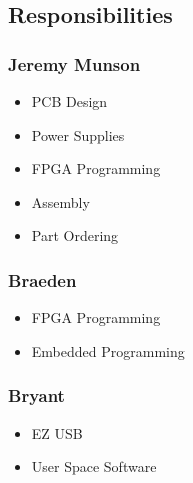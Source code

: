\subsection{Responsibilities}
	\subsubsection{Jeremy Munson}
		\begin{itemize}
			\item PCB Design
			\item Power Supplies
			\item FPGA Programming
			\item Assembly
			\item Part Ordering
		\end{itemize}

	\subsubsection{Braeden}
		\begin{itemize}
			\item FPGA Programming
			\item Embedded Programming
		\end{itemize}
		
	\subsubsection{Bryant}
		\begin{itemize}
			\item EZ USB
			\item User Space Software
		\end{itemize}